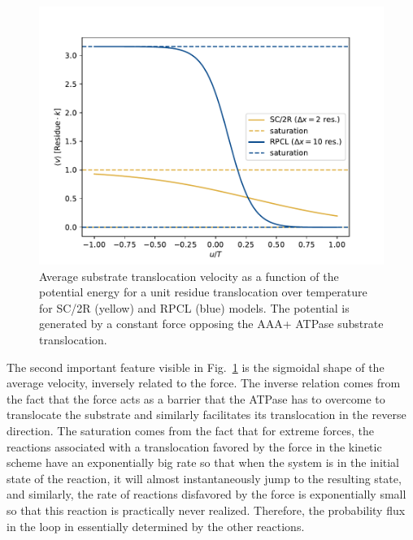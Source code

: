     \begin{figure}[h]
        \centering
        \includegraphics[width=\textwidth]{images/force.pdf}
        \caption{Average substrate translocation velocity as a function of the potential energy for a unit residue translocation over temperature for SC/2R (yellow) and RPCL (blue) models. The potential is generated by a constant force opposing the AAA+ ATPase substrate translocation.}
        \label{fig:force}
    \end{figure}
    
    The second important feature visible in Fig.~\ref{fig:force} is the sigmoidal shape of the average velocity, inversely related to the force. The inverse relation comes from the fact that the force acts as a barrier that the ATPase has to overcome to translocate the substrate and similarly facilitates its translocation in the reverse direction. The saturation comes from the fact that for extreme forces, the reactions associated with a translocation favored by the force in the kinetic scheme have an exponentially big rate so that when the system is in the initial state of the reaction, it will almost instantaneously jump to the resulting state, and similarly, the rate of reactions disfavored by the force is exponentially small so that this reaction is practically never realized. Therefore, the probability flux in the loop in essentially determined by the other reactions.
    
